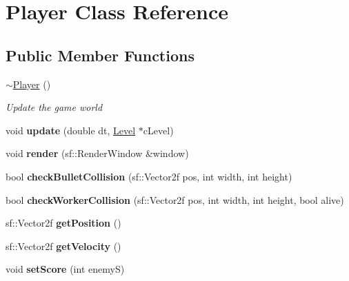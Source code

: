 \hypertarget{class_player}{}\section{Player Class Reference}
\label{class_player}
\subsection*{Public Member Functions}
\begin{DoxyCompactItemize}
\item 
\mbox{\hyperlink{class_player_a749d2c00e1fe0f5c2746f7505a58c062}{$\sim$\+Player}} ()
\begin{DoxyCompactList}\small\item\em Update the game world \end{DoxyCompactList}\item 
\mbox{\label{class_player_addfbb89aac34e1c3d7e4403f70db719d}} 
void {\bfseries update} (double dt, \mbox{\hyperlink{class_level}{Level}} $\ast$c\+Level)
\item 
\mbox{\label{class_player_a53938857e80374e79726309e78d1c15c}} 
void {\bfseries render} (sf\+::\+Render\+Window \&window)
\item 
\mbox{\label{class_player_a8a8f6e52dcdfdbe54dfa95108b426a86}} 
bool {\bfseries check\+Bullet\+Collision} (sf\+::\+Vector2f pos, int width, int height)
\item 
\mbox{\label{class_player_acaf76638c7aab982a89d8c6a162b71b9}} 
bool {\bfseries check\+Worker\+Collision} (sf\+::\+Vector2f pos, int width, int height, bool alive)
\item 
\mbox{\label{class_player_a23356f99a9de86d3d47eadb679b332dc}} 
sf\+::\+Vector2f {\bfseries get\+Position} ()
\item 
\mbox{\label{class_player_a363489e11401d5a1549e315c8c8aa220}} 
sf\+::\+Vector2f {\bfseries get\+Velocity} ()
\item 
\mbox{\label{class_player_a909949fdf7cd75ffcbaacd1a1fd68179}} 
void {\bfseries set\+Score} (int enemyS)
\item 
\mbox{\label{class_player_a9738cd9c17abc8be5b6aa01c9e3e3254}} 

\end{DoxyCompactItemize}

